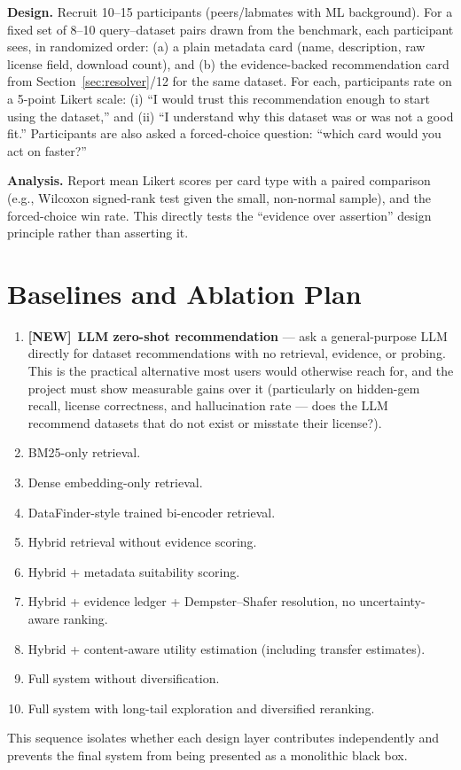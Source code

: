 \documentclass[11pt]{article}
\newcommand{\newtag}{\textcolor{accent}{\textbf{[NEW]}}\ }
\begin{document}
\textbf{Design.} Recruit 10--15 participants (peers/labmates with ML background). For a fixed set of
8--10 query--dataset pairs drawn from the benchmark, each participant sees, in randomized order: (a) a
plain metadata card (name, description, raw license field, download count), and (b) the evidence-backed
recommendation card from Section~\ref{sec:resolver}/12 for the same dataset. For each, participants rate
on a 5-point Likert scale: (i) ``I would trust this recommendation enough to start using the dataset,''
and (ii) ``I understand why this dataset was or was not a good fit.'' Participants are also asked a
forced-choice question: ``which card would you act on faster?''

\textbf{Analysis.} Report mean Likert scores per card type with a paired comparison (e.g., Wilcoxon
signed-rank test given the small, non-normal sample), and the forced-choice win rate. This directly tests
the ``evidence over assertion'' design principle rather than asserting it.

\section{Baselines and Ablation Plan}
\label{sec:ablation}
\begin{enumerate}[leftmargin=*]
\item \newtag \textbf{LLM zero-shot recommendation} --- ask a general-purpose LLM directly for dataset
      recommendations with no retrieval, evidence, or probing. This is the practical alternative most
      users would otherwise reach for, and the project must show measurable gains over it (particularly
      on hidden-gem recall, license correctness, and hallucination rate --- does the LLM recommend
      datasets that do not exist or misstate their license?).
\item BM25-only retrieval.
\item Dense embedding-only retrieval.
\item DataFinder-style trained bi-encoder retrieval.
\item Hybrid retrieval without evidence scoring.
\item Hybrid + metadata suitability scoring.
\item Hybrid + evidence ledger + Dempster--Shafer resolution, no uncertainty-aware ranking.
\item Hybrid + content-aware utility estimation (including transfer estimates).
\item Full system without diversification.
\item Full system with long-tail exploration and diversified reranking.
\end{enumerate}
This sequence isolates whether each design layer contributes independently and prevents the final system
from being presented as a monolithic black box.
\end{document}
